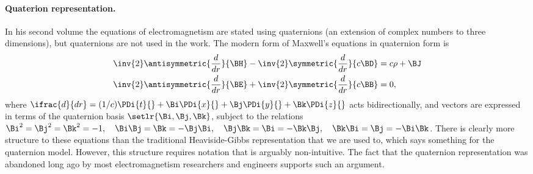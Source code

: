 \paragraph{Quaterion representation.}
In his second volume
\citep{maxwell1881treatiseVolumeII} the equations of electromagnetism are stated
using quaternions (an extension of complex numbers to three dimensions), but quaternions are not used in the work.
The modern form of Maxwell's equations in quaternion form is
\begin{dmath}\label{eqn:manyfaces:220}
\begin{aligned}
\inv{2} \antisymmetric{ \frac{d}{dr} }{ \BH } - \inv{2} \symmetric{ \frac{d}{dr} } { c \BD } &= c \rho + \BJ \\
\inv{2} \antisymmetric{ \frac{d}{dr} }{ \BE } + \inv{2} \symmetric{ \frac{d}{dr} }{ c \BB } &= 0,
\end{aligned}
\end{dmath}
where \( \ifrac{d}{dr} = (1/c) \PDi{t}{} + \Bi \PDi{x}{} + \Bj \PDi{y}{} + \Bk \PDi{z}{} \) \citep{jack2003physical} acts bidirectionally, and vectors are expressed in terms of the quaternion basis \( \setlr{ \Bi, \Bj, \Bk } \), subject to the relations \(
\Bi^2 = \Bj^2 = \Bk^2 = -1, \quad
\Bi \Bj = \Bk = -\Bj \Bi, \quad
\Bj \Bk = \Bi = -\Bk \Bj, \quad
\Bk \Bi = \Bj = -\Bi \Bk \).
There is clearly more structure to these equations than the traditional Heaviside-Gibbs representation that we are used to, which says something for the quaternion model.
However, this structure requires notation that is arguably non-intuitive.
The
fact that the quaternion representation was abandoned long ago by most electromagnetism researchers and engineers supports such an argument.

